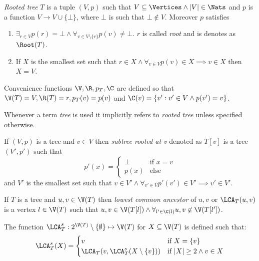 \begin{defi}
    \emph{Rooted tree} $T$ is a tuple $(V, p)$ such that $V \subseteq \Vertices \land |V| \in \Nats$ and $p$ is a function $V \to V \cup \{\bot\}$, where $\bot$ is such that $\bot \not\in V$. Moreover $p$ satisfies
    \begin{enumerate}
        \item $\exists_{r \in V} p(r) = \bot \land \forall_{v \in V\setminus\{r\}} p(v) \neq \bot$. $r$ is called \emph{root} and is denotes as $\Root(T)$.
        \item If $X$ is the smallest set such that $r \in X \land \forall_{v \in V} p(v) \in X \implies v \in X$ then $X = V$.
    \end{enumerate}
    Convenience functions $\V, \R, p_T, \C$ are defined so that $\V(T) = V, \R(T) = r, p_T(v) = p(v)$ and $\C(v) = \{v' : v' \in V \land p(v') = v\}$.

    Whenever a term \emph{tree} is used it implicitly refers to \emph{rooted tree} unless specified otherwise.
\end{defi}

\begin{defi}
    If $(V,p)$ is a tree and $v \in V$ then \emph{subtree rooted at v} denoted as $T[v]$ is a tree $(V', p')$ such that
    \[
        p'(x) = \begin{cases}
            \bot & \text{if } x = v \\
            p(x) & \text{else}
        \end{cases}
    \]
    and $V'$ is the smallest set such that $v \in V' \land \forall_{v' \in V} p'(v') \in V' \implies v' \in V'$.
\end{defi}

\begin{defi}
    If $T$ is a tree and $u,v \in \V(T)$ then \emph{lowest common ancestor} of $u, v$ or $\LCA_T(u,v)$ is a vertex $l \in \V(T)$ such that $u,v \in \V(T[l]) \land \forall_{l' \in \C(l)} u,v \not\in \V(T[l'])$.
\end{defi}

\begin{defi}
    The function $\LCA_T^s : 2^{\V(T)} \setminus \{ \emptyset \} \mapsto \V(T)$ for $X \subseteq \V(T)$ is defined such that:
    \[
        \LCA_T^s(X) = \begin{cases}
            v                                      & \text{if } X = \{v\}                \\
            \LCA_T(v, \LCA_T^s(X \setminus \{v\})) & \text{if } |X| \geq 2 \land v \in X \\
        \end{cases}
    \]
\end{defi}
